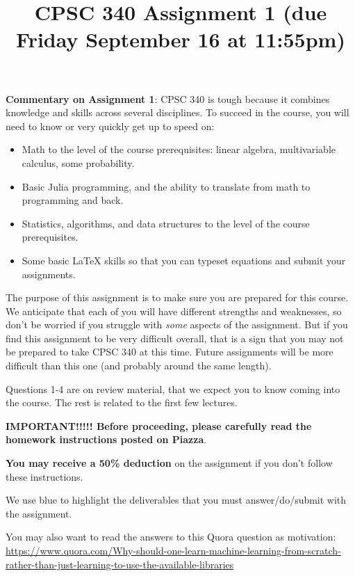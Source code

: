 \documentclass{article}
\def\blu#1{{\color{blu}#1}}
\begin{document}
\title{CPSC 340 Assignment 1 (due Friday September 16 at 11:55pm)}
\date{}
\maketitle
\vspace{-4em}

\textbf{Commentary on Assignment 1}: CPSC 340 is tough because it combines knowledge and skills across several disciplines. To succeed
in the course, you will need to know or very quickly get up to speed on:
\begin{itemize}
\item Math to the level of the course prerequisites: linear algebra, multivariable calculus, some probability.
\item Basic Julia programming, and the ability to translate from math to programming and back.
\item Statistics, algorithms, and data structures to the level of the course prerequisites.
\item Some basic LaTeX skills so that you can typeset equations and submit your assignments.
\end{itemize}

The purpose of this assignment is to make sure you are prepared for this course. We anticipate that each
of you will have different strengths and weaknesses, so don't be worried if you struggle with \emph{some} aspects
of the assignment. But if you find this assignment
to be very difficult overall, that is a sign that you may not be prepared to take CPSC 340
at this time. Future assignments will be more difficult than this one (and probably around the same length).

Questions 1-4 are on review material, that we expect you to know coming into the course. The rest is related to the first few lectures.

\textbf{IMPORTANT!!!!! Before proceeding, please carefully read the homework instructions posted on Piazza}.

\textbf{You may receive a 50\% deduction} on the assignment if you don't follow these instructions.

We use \blu{blue} to highlight the deliverables that you must answer/do/submit with the assignment.

You may also want to read the answers to this Quora question as motivation:\\
{\scriptsize \url{https://www.quora.com/Why-should-one-learn-machine-learning-from-scratch-rather-than-just-learning-to-use-the-available-libraries}}
\end{document}
